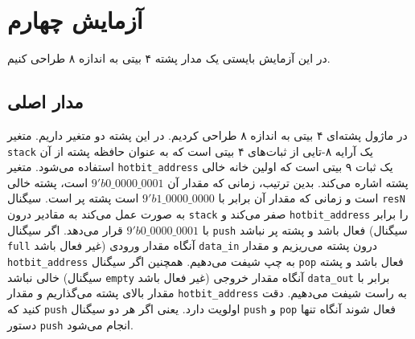 \documentclass{perassignments}
\renewcommand{\maketitle}{\MakeMyLabTitle}
\newcommand{\vars}[1]{\texttt{#1}}
\begin{document}
	\maketitle
	\section{آزمایش چهارم}
	در این آزمایش بایستی یک مدار پشته ۴ بیتی به اندازه ۸ طراحی کنیم.
	 \subsection{مدار اصلی}
	در ماژول 
	پشته‌ای ۴ بیتی به اندازه ۸ طراحی کردیم. در این پشته دو متغیر داریم. متغیر 
	\vars{stack}
	یک آرایه ۸-تایی از ثبات‌های ۴ بیتی است که به عنوان حافظه پشته از آن استفاده می‌شود. متغیر 
	\vars{hotbit\_address}
	یک ثبات ۹ بیتی است که اولین خانه خالی پشته اشاره می‌کند. بدین ترتیب، زمانی که مقدار آن
	\(9'b0\_0000\_0001\)
	است، پشته خالی است و زمانی که مقدار آن برابر با 
	\(9'b1\_0000\_0000\)
	است پشته پر است. سیگنال 
	\vars{resN}
	به صورت 
	عمل می‌کند به مقادیر درون 
	\vars{stack}
	صفر می‌کند و 
	\vars{hotbit\_address}
	را برابر با 
	\(9'b0\_0000\_0001\)
	قرار می‌دهد. اگر سیگنال 
	\vars{push}
	فعال باشد و پشته پر نباشد (سیگنال 
	\vars{full}
	غیر فعال باشد) آنگاه مقدار ورودی 
	\vars{data\_in}
	درون پشته می‌ریزیم و مقدار 
	\vars{hotbit\_address}
	به چپ شیفت می‌دهیم. همچنین اگر سیگنال 
	\vars{pop}
	فعال باشد و پشته خالی نباشد (سیگنال 
	\vars{empty}
	غیر فعال باشد) آنگاه مقدار خروجی 
	\vars{data\_out}
	برابر با مقدار بالای پشته می‌گذاریم و مقدار 
	\vars{hotbit\_address}
	به راست شیفت می‌دهیم. دقت کنید که 
	\vars{push}
	اولویت دارد. یعنی 
	 اگر هر دو سیگنال 
	\vars{push}
	و 
	\vars{pop}
	فعال شوند آنگاه تنها دستور 
	\vars{push}
	انجام می‌شود.
	 \begin{latin}
	 	\raggedleft
	 	
	 \end{latin}
\end{document}

